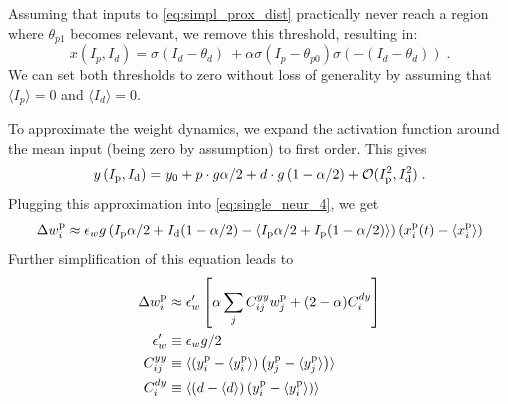 \documentclass[10pt,a4paper]{article}
\newcommand{\avg}[1]{\langle #1 \rangle}
\begin{document}
Assuming that inputs to \eqref{eq:simpl_prox_dist} practically never reach a region where $\theta_{p1}$ becomes relevant, we remove this threshold, resulting in:
\begin{equation}
x\left(I_p,I_d\right) = \sigma\left(I_d-\theta_d\right)\ + \alpha\sigma\left(I_p-\theta_{p0}\right)\sigma\left(-\left(I_d-\theta_d\right)\right) \; . \label{eq:simpl_further_prox_dist}
\end{equation}
We can set both thresholds to zero without loss of generality by assuming that $\langle I_p \rangle = 0$ and $\langle I_d \rangle = 0$.

To approximate the weight dynamics, we expand the activation function around the mean input (being zero by assumption) to first order. This gives
\begin{equation}
y\left(I_{\rm p},I_{\rm d}\right) =  y_0 + p \cdot g \alpha/2  + d \cdot g \left(1-\alpha/2\right) + \mathcal{O}(I_{\rm p}^2,I_{\rm d}^2) \; .
\end{equation}
Plugging this approximation into \eqref{eq:single_neur_4}, we get
\begin{equation}
\Delta w^{\rm p}_{i} \approx \epsilon_w g \left( I_{\rm p} \alpha/2  + I_{\rm d}(1-\alpha/2) -\langle  I_{\rm p} \alpha/2  + I_{\rm p}(1-\alpha/2) \rangle\right)\left(x^{\rm p}_{i}(t)-\langle x^{\rm p}_{i} \rangle \right)
\end{equation}
Further simplification of this equation leads to
\begin{align}
\Delta w^{\rm p}_{i} &\approx \epsilon'_w \left[\alpha \sum_j  C^{yy}_{ij} w^{\rm p}_{j} + (2-\alpha) C^{dy}_i \label{eq:approx_delta_w}\right] \\
\epsilon'_w &\equiv \epsilon_w g /2 \\
C^{yy}_{ij} &\equiv \avg{\left(y^{\rm p}_{i} - \avg{y^{\rm p}_{i}} \right)\left( y^{\rm p}_{j} - \avg{y^{\rm p}_{j}} \right)} \\
C^{dy}_i &\equiv \avg{\left(d - \avg{d} \right) \left(y^{\rm p}_{i} - \avg{y^{\rm p}_{i}} \right)}
\end{align}


\end{document}
